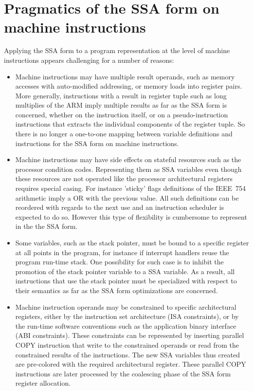 \section{Pragmatics of the SSA form on machine instructions}

Applying the SSA form to a program representation at the level of machine
instructions appears challenging for a number of reasons:
\begin{itemize}

\item Machine instructions may have multiple result operands, such as memory
accesses with auto-modified addressing, or memory loads into register pairs.
More generally, instructions with a result in register tuple such as long
multiplies of the ARM imply multiple results as far as the SSA form is
concerned, whether on the instruction itself, or on a pseudo-instruction
instructions that extracts the individual components of the register tuple.  So
there is no longer a one-to-one mapping between variable definitions and
instructions for the SSA form on machine instructions.

\item Machine instructions may have side effects on stateful resources such as
the processor condition codes. Representing them as SSA variables even though
these resources are not operated like the processor architectural registers
requires special casing. For instance 'sticky' flags definitions of the IEEE~754
arithmetic imply a OR with the previous value. All such definitions can be
reordered with regards to the next use and an instruction scheduler is expected
to do so. However this type of flexibility is cumbersome to represent in the the
SSA form.

\item Some variables, such as the stack pointer, must be bound to a specific
register at all points in the program, for instance if interrupt handlers reuse
the program run-time stack. One possibility for such case is to inhibit the
promotion of the stack pointer variable to a SSA variable. As a result, all
instructions that use the stack pointer must be specialized with respect to
their semantics as far as the SSA form optimizations are concerned.

\item Machine instruction operands may be constrained to specific architectural
registers, either by the instruction set architecture (ISA constraints), or by
the run-time software conventions such as the application binary interface (ABI
constraints). These constraints can be represented by inserting parallel COPY
instruction that write to the constrained operands or read from the constrained
results of the instructions. The new SSA variables thus created are pre-colored
with the required architectural register. These parallel COPY instructions are
later processed by the coalescing phase of the SSA form register allocation.


\end{itemize}
